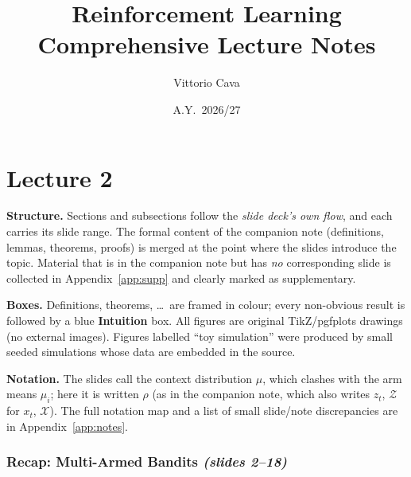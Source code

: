 \documentclass[11pt,a4paper]{article}
\title{\textbf{Reinforcement Learning}\\[6pt]\large Comprehensive Lecture Notes}
\author{Vittorio Cava}
\date{A.Y.~2026/27}
\newcommand{\calX}{\mathcal{X}}
\newcommand{\slides}[1]{\emph{(slides #1)}}
\theoremstyle{plain}
\theoremstyle{definition}
\theoremstyle{remark}
\begin{document}
\maketitle
\tableofcontents
\newpage

\setcounter{section}{0}
\renewcommand{\thesection}{\arabic{section}}
\part{Lecture 2}

\begin{tcolorbox}[enhanced,colback=white,colframe=black!40,boxrule=0.5pt,arc=2pt,title={\small How to read these notes},fonttitle=\bfseries]
\small
\textbf{Structure.} Sections and subsections follow the \emph{slide deck's own flow}, and each carries its
slide range. The formal content of the companion note (definitions, lemmas, theorems, proofs) is merged at
the point where the slides introduce the topic. Material that is in the companion note but has \emph{no}
corresponding slide is collected in Appendix~\ref{app:supp} and clearly marked as supplementary.

\textbf{Boxes.} Definitions, theorems, \dots\ are framed in colour; every non-obvious result is followed by a
blue \textbf{Intuition} box. All figures are original TikZ/pgfplots drawings (no external images). Figures
labelled ``toy simulation'' were produced by small seeded simulations whose data are embedded in the source.

\textbf{Notation.} The slides call the context distribution $\mu$, which clashes with the arm means $\mu_i$;
here it is written $\rho$ (as in the companion note, which also writes $z_t$, $\mathcal Z$ for $x_t$, $\calX$).
The full notation map and a list of small slide/note discrepancies are in Appendix~\ref{app:notes}.
\end{tcolorbox}
\newcommand{\civ}[4]{%
  \draw[thick] (#1,{#2-#4}) -- (#1,{#2+#4});
  \fill (#1,{#2-#4}) circle (1.8pt); \fill (#1,{#2+#4}) circle (1.8pt); \fill (#1,#2) circle (1.8pt);
  \fill[green!50!black] (#1,#3) circle (2.4pt);}

\section{Recap: Multi-Armed Bandits \slides{2--18}}
\end{document}
